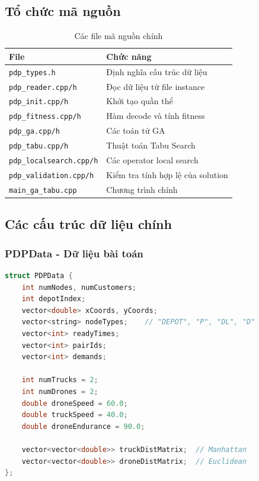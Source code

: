 \documentclass[12pt,a4paper]{article}
\begin{document}
\subsection{Tổ chức mã nguồn}

\begin{table}[H]
\centering
\caption{Các file mã nguồn chính}
\begin{tabular}{ll}
\toprule
\textbf{File} & \textbf{Chức năng} \\
\midrule
\texttt{pdp\_types.h} & Định nghĩa cấu trúc dữ liệu \\
\texttt{pdp\_reader.cpp/h} & Đọc dữ liệu từ file instance \\
\texttt{pdp\_init.cpp/h} & Khởi tạo quần thể \\
\texttt{pdp\_fitness.cpp/h} & Hàm decode và tính fitness \\
\texttt{pdp\_ga.cpp/h} & Các toán tử GA \\
\texttt{pdp\_tabu.cpp/h} & Thuật toán Tabu Search \\
\texttt{pdp\_localsearch.cpp/h} & Các operator local search \\
\texttt{pdp\_validation.cpp/h} & Kiểm tra tính hợp lệ của solution \\
\texttt{main\_ga\_tabu.cpp} & Chương trình chính \\
\bottomrule
\end{tabular}
\end{table}

\subsection{Các cấu trúc dữ liệu chính}

\subsubsection{PDPData - Dữ liệu bài toán}

\begin{lstlisting}[language=C++]
struct PDPData {
    int numNodes, numCustomers;
    int depotIndex;
    vector<double> xCoords, yCoords;
    vector<string> nodeTypes;    // "DEPOT", "P", "DL", "D"
    vector<int> readyTimes;
    vector<int> pairIds;
    vector<int> demands;
    
    int numTrucks = 2;
    int numDrones = 2;
    double droneSpeed = 60.0;
    double truckSpeed = 40.0;
    double droneEndurance = 90.0;
    
    vector<vector<double>> truckDistMatrix;  // Manhattan
    vector<vector<double>> droneDistMatrix;  // Euclidean
};
\end{lstlisting}
\end{document}
